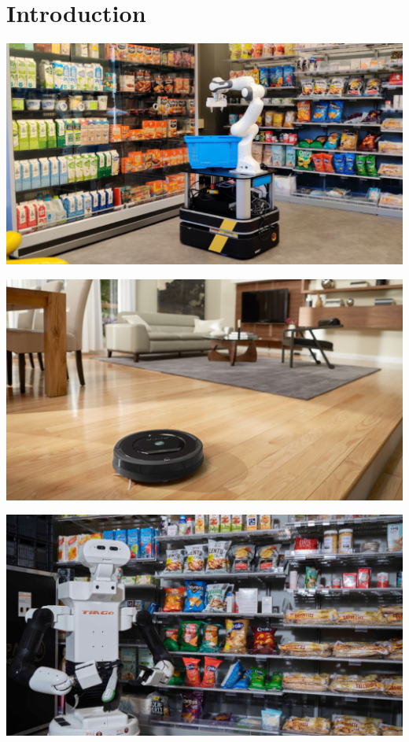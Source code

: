\section{Introduction}

\begin{frame}[fragile]{} 
\begin{center}
\includegraphics[height=0.9\textheight]{figures/introduction/robot2}
\end{center}
\end{frame}
\begin{frame}[fragile]{} 
\begin{center}
\includegraphics[height=0.9\textheight]{figures/introduction/robot4}
\end{center}
\end{frame}
\begin{frame}[fragile]{} 
\begin{center}
\includegraphics[height=0.9\textheight]{figures/introduction/robot3}
\end{center}
\end{frame}

